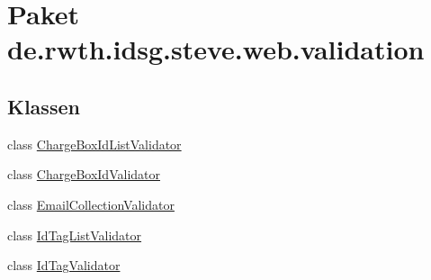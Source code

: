 \hypertarget{namespacede_1_1rwth_1_1idsg_1_1steve_1_1web_1_1validation}{\section{Paket de.\+rwth.\+idsg.\+steve.\+web.\+validation}
\label{namespacede_1_1rwth_1_1idsg_1_1steve_1_1web_1_1validation}
}
\subsection*{Klassen}
\begin{DoxyCompactItemize}
\item 
class \hyperlink{classde_1_1rwth_1_1idsg_1_1steve_1_1web_1_1validation_1_1_charge_box_id_list_validator}{Charge\+Box\+Id\+List\+Validator}
\item 
class \hyperlink{classde_1_1rwth_1_1idsg_1_1steve_1_1web_1_1validation_1_1_charge_box_id_validator}{Charge\+Box\+Id\+Validator}
\item 
class \hyperlink{classde_1_1rwth_1_1idsg_1_1steve_1_1web_1_1validation_1_1_email_collection_validator}{Email\+Collection\+Validator}
\item 
class \hyperlink{classde_1_1rwth_1_1idsg_1_1steve_1_1web_1_1validation_1_1_id_tag_list_validator}{Id\+Tag\+List\+Validator}
\item 
class \hyperlink{classde_1_1rwth_1_1idsg_1_1steve_1_1web_1_1validation_1_1_id_tag_validator}{Id\+Tag\+Validator}
\end{DoxyCompactItemize}
